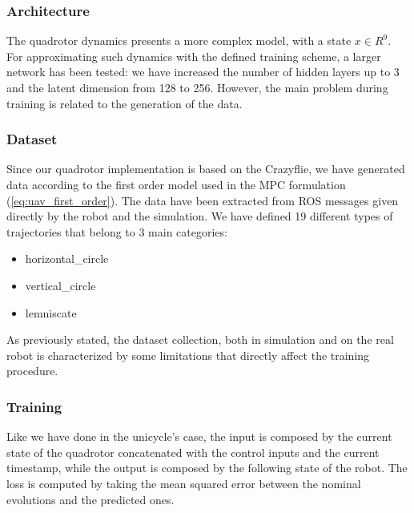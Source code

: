 \subsubsection{Architecture}
The quadrotor dynamics presents a more complex model, with a state $x \in
R^9$. For approximating such dynamics with the defined training scheme, a
larger network has been tested: we have increased the number of hidden
layers up to 3 and the latent dimension from 128 to 256. However, the main
problem during training is related to the generation of the data.

\subsubsection{Dataset}
Since our quadrotor implementation is based on the Crazyflie, we have generated data according to the first order model used in the MPC formulation (\ref{eq:uav_first_order}). The data have been extracted from ROS messages given directly by the robot and the simulation. We have defined 19 different types of trajectories that belong to 3 main categories:
\begin{itemize}
    \item horizontal\_circle
    \item vertical\_circle 
    \item lemniscate
\end{itemize} 
As previously stated, the dataset collection, both in simulation and on the real robot is characterized by some limitations that directly affect the training procedure.
\subsubsection{Training}
Like we have done in the unicycle's case, the input is composed by the current state of the quadrotor concatenated with the control inputs and the current timestamp, while the output is composed by the following state of the robot. The loss is computed by taking the mean squared error between the nominal evolutions and the predicted ones. 